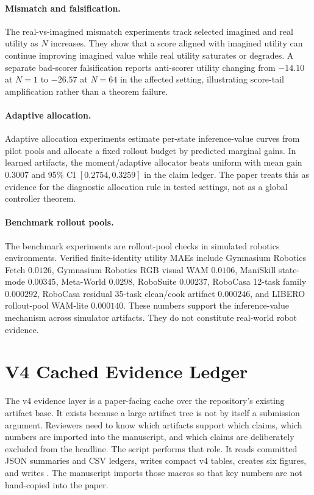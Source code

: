 \paragraph{Mismatch and falsification.}
The real-vs-imagined mismatch experiments track selected imagined and real utility as $N$ increases. They show that a score aligned with imagined utility can continue improving imagined value while real utility saturates or degrades. A separate bad-scorer falsification reports anti-scorer utility changing from $-14.10$ at $N=1$ to $-26.57$ at $N=64$ in the affected setting, illustrating score-tail amplification rather than a theorem failure.

\paragraph{Adaptive allocation.}
Adaptive allocation experiments estimate per-state inference-value curves from pilot pools and allocate a fixed rollout budget by predicted marginal gains. In learned artifacts, the moment/adaptive allocator beats uniform with mean gain $0.3007$ and 95\% CI $[0.2754,0.3259]$ in the claim ledger. The paper treats this as evidence for the diagnostic allocation rule in tested settings, not as a global controller theorem.

\paragraph{Benchmark rollout pools.}
The benchmark experiments are rollout-pool checks in simulated robotics environments. Verified finite-identity utility MAEs include Gymnasium Robotics Fetch $0.0126$, Gymnasium Robotics RGB visual WAM $0.0106$, ManiSkill state-mode $0.00345$, Meta-World $0.0298$, RoboSuite $0.00237$, RoboCasa 12-task family $0.000292$, RoboCasa residual 35-task clean/cook artifact $0.000246$, and LIBERO rollout-pool WAM-lite $0.000140$. These numbers support the inference-value mechanism across simulator artifacts. They do not constitute real-world robot evidence.

\section{V4 Cached Evidence Ledger}
\label{app:v4-ledger}

The v4 evidence layer is a paper-facing cache over the repository's existing
artifact base. It exists because a large artifact tree is not by itself a
submission argument. Reviewers need to know which artifacts support which
claims, which numbers are imported into the manuscript, and which claims are
deliberately excluded from the headline. The script
 performs that role. It reads committed
JSON summaries and CSV ledgers, writes compact v4 tables, creates six figures,
and writes . The manuscript imports those macros
so that key numbers are not hand-copied into the paper.

